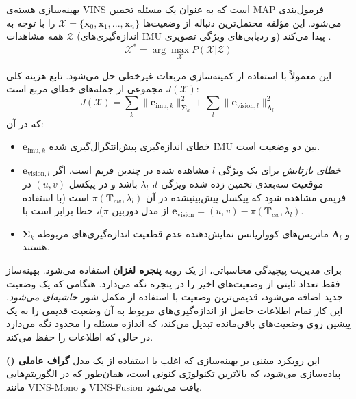 \documentclass[11pt, a4paper]{article}
\begin{document}
	بهینه‌سازی هسته‌ی \gls{VINS} است که به عنوان یک مسئله تخمین \Gls{MAP} فرمول‌بندی می‌شود. این مؤلفه محتمل‌ترین دنباله از وضعیت‌ها $\mathcal{X} = \{\mathbf{x}_0, \mathbf{x}_1, ..., \mathbf{x}_n\}$ را با توجه به همه مشاهدات $\mathcal{Z}$ (اندازه‌گیری‌های IMU و ردیابی‌های ویژگی تصویری) پیدا می‌کند \cite{indelman2012factor}.
	\[
	\mathcal{X}^* = \arg\max_{\mathcal{X}} P(\mathcal{X} | \mathcal{Z})
	\]
	
	این معمولاً با استفاده از کمینه‌سازی مربعات غیرخطی حل می‌شود. تابع هزینه کلی $J(\mathcal{X})$ مجموعی از جمله‌های خطای مربع است:
	\[
	J(\mathcal{X}) = \sum_{k} \lVert \mathbf{e}_{\text{imu},k} \rVert^2_{\mathbf{\Sigma}_k} + \sum_{l} \lVert \mathbf{e}_{\text{vision},l} \rVert^2_{\mathbf{\Lambda}_l}
	\]
	که در آن:
	\begin{itemize}
		\item $\mathbf{e}_{\text{imu},k}$ خطای اندازه‌گیری پیش‌انتگرال‌گیری شده IMU بین دو وضعیت است.
		\item $\mathbf{e}_{\text{vision},l}$ \emph{خطای بازتابش} برای یک ویژگی $l$ مشاهده شده در چندین فریم است. اگر موقعیت سه‌بعدی تخمین زده شده ویژگی $l$، $\lambda_l$ باشد و در پیکسل $(u, v)$ در فریمی مشاهده شود که پیکسل پیش‌بینیشده در آن $\pi(\mathbf{T}_{cw}, \lambda_l)$ است (با استفاده از مدل دوربین $\pi$)، خطا برابر است با $\mathbf{e}_{\text{vision}} = (u, v) - \pi(\mathbf{T}_{cw}, \lambda_l)$.
		\item $\mathbf{\Sigma}_k$ و $\mathbf{\Lambda}_l$ ماتریس‌های کوواریانس نمایش‌دهنده عدم قطعیت اندازه‌گیری‌های مربوطه هستند.
	\end{itemize}
	
	برای مدیریت پیچیدگی محاسباتی، از یک رویه \textbf{پنجره لغزان} استفاده می‌شود. بهینه‌ساز فقط تعداد ثابتی از وضعیت‌های اخیر را در پنجره نگه می‌دارد. هنگامی که یک وضعیت جدید اضافه می‌شود، قدیمی‌ترین وضعیت با استفاده از مکمل شور \emph{حاشیه‌ای می‌شود}. این کار تمام اطلاعات حاصل از اندازه‌گیری‌های مربوط به آن وضعیت قدیمی را به یک پیشین روی وضعیت‌های باقی‌مانده تبدیل می‌کند، که اندازه مسئله را محدود نگه می‌دارد در حالی که اطلاعات را حفظ می‌کند.
	
	این رویکرد مبتنی بر بهینه‌سازی که اغلب با استفاده از یک مدل \textbf{گراف عاملی
		()}
	پیاده‌سازی می‌شود، که بالاترین تکنولوژی کنونی است، همان‌طور که در الگوریتم‌هایی مانند VINS-Mono و VINS-Fusion یافت می‌شود.
	
\end{document}
